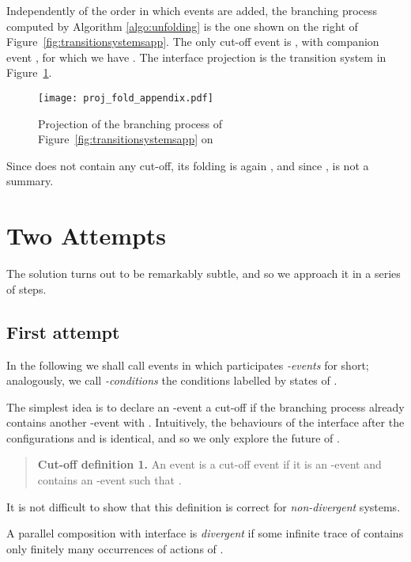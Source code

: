 \documentclass{llncs}
\begin{document}
Independently of the order in which events are added, the branching process  computed  
by Algorithm \ref{algo:unfolding} is the one shown on the right of Figure~\ref{fig:transitionsystemsapp}. The only cut-off event is , with companion event , for which we 
have  .  The interface projection  is the transition system in Figure~\ref{fig:projectionapp}. 

\begin{figure}[htbp]
\centering
\texttt{[image: proj\_fold\_appendix.pdf]}
\caption{Projection of the branching process of Figure~\ref{fig:transitionsystemsapp} on 
}\label{fig:projectionapp}
\end{figure}

Since  does not contain any cut-off, its folding is again
, and since ,  is
not a summary.

\section{Two Attempts}

The solution turns out to be remarkably subtle, and so we approach it in a series of steps.

\subsection{First attempt} 

In the following we shall call events in which  participates
{\em -events} for short; analogously, we call {\em -conditions} the 
conditions labelled by states of .

The simplest idea is to declare an -event  a cut-off if the 
branching process already contains another -event  with . Intuitively, the behaviours of the interface after the configurations  and  is identical, and so we only explore the future of .

\begin{quote}
{\bf Cut-off definition 1.} An event  is a cut-off event 
if it is an -event and  contains an -event  such that
 . 
\end{quote}

It is not difficult to show that this definition is correct for 
{\em non-divergent} systems.

\begin{definition}
A parallel composition  with interface  is 
{\em divergent} if some infinite trace of  contains only finitely many occurrences of actions of . 
\end{definition}
\end{document}
